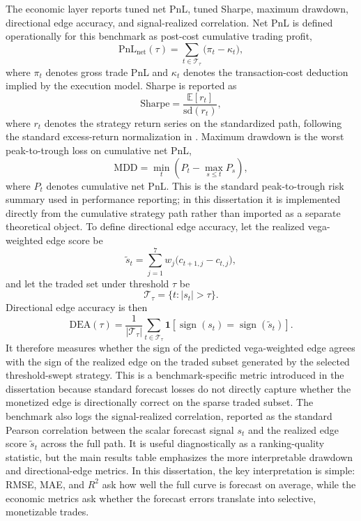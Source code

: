 \documentclass[12pt]{report}
\begin{document}
The economic layer reports tuned net PnL, tuned Sharpe, maximum drawdown, directional edge accuracy, and signal-realized correlation. Net PnL is defined operationally for this benchmark as post-cost cumulative trading profit,
\[
\mathrm{PnL}_{\mathrm{net}}(\tau)=\sum_{t\in\mathcal{T}_\tau}\big(\pi_t-\kappa_t\big),
\]
where \(\pi_t\) denotes gross trade PnL and \(\kappa_t\) denotes the transaction-cost deduction implied by the execution model. Sharpe is reported as
\[
\mathrm{Sharpe}=\frac{\mathbb{E}[r_t]}{\mathrm{sd}(r_t)},
\]
where \(r_t\) denotes the strategy return series on the standardized path, following the standard excess-return normalization in \citet{sharpe1994}. Maximum drawdown is the worst peak-to-trough loss on cumulative net PnL,
\[
\mathrm{MDD}=\min_t\left(P_t-\max_{s\le t}P_s\right),
\]
where \(P_t\) denotes cumulative net PnL. This is the standard peak-to-trough risk summary used in performance reporting; in this dissertation it is implemented directly from the cumulative strategy path rather than imported as a separate theoretical object. To define directional edge accuracy, let the realized vega-weighted edge score be
\[
\tilde{s}_t=\sum_{j=1}^{7} w_j \big(c_{t+1,j}-c_{t,j}\big),
\]
and let the traded set under threshold \(\tau\) be
\[
\mathcal{T}_\tau=\{t:\lvert s_t\rvert>\tau\}.
\]
Directional edge accuracy is then
\[
\mathrm{DEA}(\tau)=\frac{1}{|\mathcal{T}_\tau|}\sum_{t\in\mathcal{T}_\tau}\mathbf{1}\!\left[\operatorname{sign}(s_t)=\operatorname{sign}(\tilde{s}_t)\right].
\]
It therefore measures whether the sign of the predicted vega-weighted edge agrees with the sign of the realized edge on the traded subset generated by the selected threshold-swept strategy. This is a benchmark-specific metric introduced in the dissertation because standard forecast losses do not directly capture whether the monetized edge is directionally correct on the sparse traded subset. The benchmark also logs the signal-realized correlation, reported as the standard Pearson correlation between the scalar forecast signal \(s_t\) and the realized edge score \(\tilde{s}_t\) across the full path. It is useful diagnostically as a ranking-quality statistic, but the main results table emphasizes the more interpretable drawdown and directional-edge metrics. In this dissertation, the key interpretation is simple: RMSE, MAE, and \(R^2\) ask how well the full curve is forecast on average, while the economic metrics ask whether the forecast errors translate into selective, monetizable trades.
\end{document}
